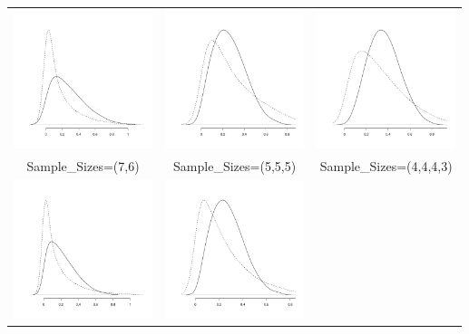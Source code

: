 \begin{appendix}
\begin{longtable}{ccc}
		\includegraphics[width=4.05cm]{Sim_Kendall-Kruskal_76_b.pdf} & 
		\includegraphics[width=4.05cm]{Sim_Kendall-Kruskal_555_a.pdf} & 
		\includegraphics[width=4.05cm]{Sim_Kendall-Kruskal_4443_a.pdf} \\ 
		              Sample\_Sizes=(7,6) &   Sample\_Sizes=(5,5,5)  &    Sample\_Sizes=(4,4,4,3) \\  
\hline 
	\includegraphics[width=4.05cm]{Sim_Kendall-Kruskal_1010_b.pdf} & 
		\includegraphics[width=4.05cm]{Sim_Kendall-Kruskal_776_a.pdf} & 

\end{longtable}
\end{appendix}
